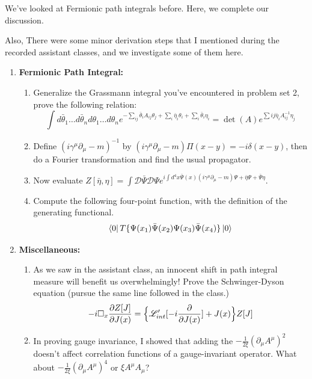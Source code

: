\documentclass[11pt]{article}
\begin{document}
\begin{problem}
	We've looked at Fermionic path integrals before. Here, we complete our discussion.
	
	\noindent
	Also, There were some minor derivation steps that I mentioned during the recorded assistant classes, and we investigate some of them here.
	
	
	
\end{problem}
\begin{enumerate}
	\item
	\begin{problem}{}
		\textbf{Fermionic Path Integral:}
		\begin{enumerate}
			\item
			Generalize the Grassmann integral you've encountered in problem set 2, prove the following relation:
			\[
			\int d\bar{\theta}_1 \dots d\bar{\theta}_n d\theta_1 \dots d\theta_n 
			e^{-\sum_{ij}\bar{\theta}_i A_{ij}\theta_j + \sum_i \bar{\eta}_i\theta_i + \sum_i \bar{\theta}_i \eta_i} = \det(A) e^{\sum{ij}\bar{\eta}_i A^{-1}_{ij}\eta_j}
			\]
			\item Define $(i\gamma^\mu\partial_\mu -m)^{-1}$ by $(i\gamma^\mu\partial_\mu -m)\Pi(x-y) = -i\delta(x-y)$, then do a Fourier transformation and find the usual propagator.
			\item Now evaluate $Z[\bar{\eta},\eta] = \int \mathcal{D}\bar{\Psi}\mathcal{D}\Psi e^{i\int d^4x \bar{\Psi}(x)(i\gamma^\mu\partial_\mu -m)\Psi + \bar{\eta}\Psi + \bar{\Psi}\eta}$.
			\item Compute the following four-point function, with the definition of the generating functional.
			\[
			\bra{0}T\{\Psi(x_1)\bar{\Psi}(x_2)\Psi(x_3)\bar{\Psi}(x_4)\}\ket{0}
			\]
		\end{enumerate}
		
	\end{problem}
	\item
	\begin{problem}{\points{-}}
		\textbf{Miscellaneous:}
		\begin{enumerate}
			\item As we saw in the assistant class, an innocent shift in path integral measure will benefit us overwhelmingly! Prove the Schwinger-Dyson equation (pursue the same line followed in the class.)
			\[
			-i\Box_x \frac{\partial Z[J]}{\partial J(x)} = \Bigl\{\mathscr{L}_{int}^{\prime}[-i\frac{\partial}{\partial J(x)}]+ J(x)\Bigr\} Z[J]
			\]
			\item In proving gauge invariance, I showed that adding the $-\frac{1}{2\xi}(\partial_\mu A^\mu)^2$ doesn't affect correlation functions of a gauge-invariant operator. What about $-\frac{1}{2\xi}(\partial_\mu A^\mu)^4$ or $\xi A^\mu A_\mu$?
		\end{enumerate}
	\end{problem}
	
\end{enumerate}
\end{document}
